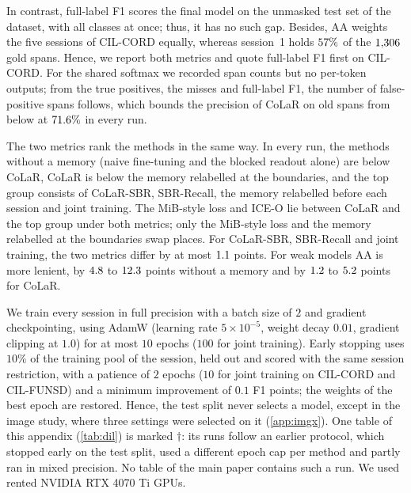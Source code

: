  In contrast, full-label F1 scores the final model on the unmasked test set of the dataset, with all classes at once; thus, it has no such gap. Besides, AA weights the five sessions of CIL-CORD equally, whereas session~1 holds $57\%$ of the $1{,}306$ gold spans. Hence, we report both metrics and quote full-label F1 first on CIL-CORD. For the shared softmax we recorded span counts but no per-token outputs; from the true positives, the misses and full-label F1, the number of false-positive spans follows, which bounds the precision of CoLaR on old spans from below at $71.6\%$ in every run.

 The two metrics rank the methods in the same way. In every run, the methods without a memory (naive fine-tuning and the blocked readout alone) are below CoLaR, CoLaR is below the memory relabelled at the boundaries, and the top group consists of CoLaR-SBR, SBR-Recall, the memory relabelled before each session and joint training. The MiB-style loss and ICE-O lie between CoLaR and the top group under both metrics; only the MiB-style loss and the memory relabelled at the boundaries swap places. For CoLaR-SBR, SBR-Recall and joint training, the two metrics differ by at most $1.1$ points. For weak models AA is more lenient, by $4.8$ to $12.3$ points without a memory and by $1.2$ to $5.2$ points for CoLaR.

 We train every session in full precision with a batch size of $2$ and gradient checkpointing, using AdamW (learning rate $5{\times}10^{-5}$, weight decay $0.01$, gradient clipping at $1.0$) for at most $10$ epochs ($100$ for joint training). Early stopping uses $10\%$ of the training pool of the session, held out and scored with the same session restriction, with a patience of $2$ epochs ($10$ for joint training on CIL-CORD and CIL-FUNSD) and a minimum improvement of $0.1$ F1 points; the weights of the best epoch are restored. Hence, the test split never selects a model, except in the image study, where three settings were selected on it (\cref{app:imgx}). One table of this appendix (\cref{tab:dil}) is marked $\dagger$: its runs follow an earlier protocol, which stopped early on the test split, used a different epoch cap per method and partly ran in mixed precision. No table of the main paper contains such a run. We used rented NVIDIA RTX 4070 Ti GPUs.

